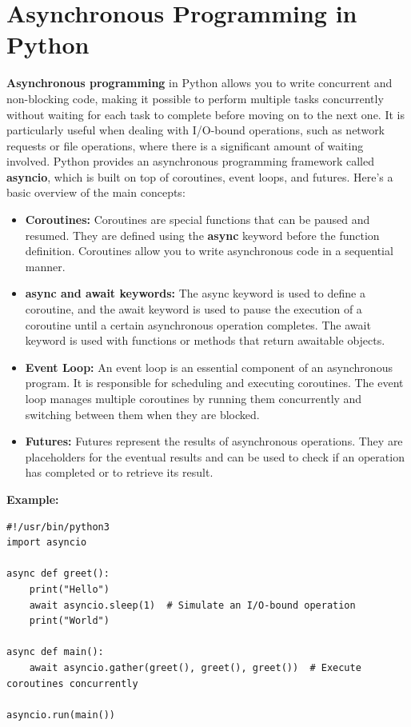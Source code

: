 \documentclass{report}
\begin{document}
    \pagebreak \bigbreak \noindent
    \section{Asynchronous Programming in Python}
    \bigbreak \noindent 
    \textbf{Asynchronous programming} in Python allows you to write concurrent and non-blocking code, making it possible to perform multiple tasks concurrently without waiting for each task to complete before moving on to the next one. It is particularly useful when dealing with I/O-bound operations, such as network requests or file operations, where there is a significant amount of waiting involved.
    \bigbreak \noindent 
    Python provides an asynchronous programming framework called \textbf{asyncio}, which is built on top of coroutines, event loops, and futures. Here's a basic overview of the main concepts:
    \begin{itemize}
        \item \textbf{Coroutines:} Coroutines are special functions that can be paused and resumed. They are defined using the \textbf{async} keyword before the function definition. Coroutines allow you to write asynchronous code in a sequential manner.
        \item \textbf{async and await keywords:} The async keyword is used to define a coroutine, and the await keyword is used to pause the execution of a coroutine until a certain asynchronous operation completes. The await keyword is used with functions or methods that return awaitable objects.
        \item \textbf{Event Loop:} An event loop is an essential component of an asynchronous program. It is responsible for scheduling and executing coroutines. The event loop manages multiple coroutines by running them concurrently and switching between them when they are blocked.
        \item \textbf{Futures:} Futures represent the results of asynchronous operations. They are placeholders for the eventual results and can be used to check if an operation has completed or to retrieve its result.
    \end{itemize}
    \bigbreak \noindent 
    \begin{mdframed}
      \textbf{Example: }
      \begin{verbatim}
#!/usr/bin/python3
import asyncio

async def greet():
    print("Hello")
    await asyncio.sleep(1)  # Simulate an I/O-bound operation
    print("World")

async def main():
    await asyncio.gather(greet(), greet(), greet())  # Execute coroutines concurrently

asyncio.run(main())
      \end{verbatim}
    \end{mdframed}
    \bigbreak \noindent 
    \bigbreak \noindent 
    \pagebreak \bigbreak \noindent
\end{document}
